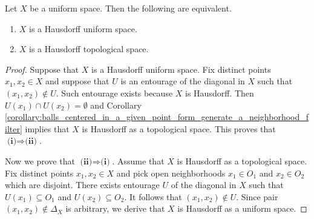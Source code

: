\documentclass[10pt]{amsart}
\begin{document}
\begin{fact}\label{fact:Hausdorff_uniform_space_is_Hausdorff_as_a_topological_space}
	Let $X$ be a uniform space. Then the following are equivalent.
	\begin{enumerate}[label=\emph{\textbf{(\arabic*)}}, leftmargin=3.0em]
		\item $X$ is a Hausdorff uniform space.
		\item $X$ is a Hausdorff topological space.
	\end{enumerate}
\end{fact}
\begin{proof}
	Suppose that $X$ is a Hausdorff uniform space. Fix distinct points $x_1,x_2 \in X$ and suppose that $U$ is an entourage of the diagonal in $X$ such that $(x_1,x_2) \not \in U$. Such entourage exists because $X$ is Hausdorff. Then $U(x_1)\cap U(x_2) = \emptyset$ and Corollary \ref{corollary:balls_centered_in_a_given_point_form_generate_a_neighborhood_filter} implies that $X$ is Hausdorff as a topological space. This proves that $\textbf{(i)}\Rightarrow \textbf{(ii)}$.

	Now we prove that $\textbf{(ii)}\Rightarrow \textbf{(i)}$. Assume that $X$ is Hausdorff as a topological space. Fix distinct points $x_1,x_2 \in X$ and pick open neighborhoods $x_1 \in O_1$ and $x_2 \in O_2$ which are disjoint. There exists entourage $U$ of the diagonal in $X$ such that $U(x_1) \subseteq O_1$ and $U(x_2) \subseteq O_2$. It follows that $(x_1,x_2) \not \in U$. Since pair $(x_1,x_2) \not \in \Delta_X$ is arbitrary, we derive that $X$ is Hausdorff as a uniform space.
\end{proof}
\end{document}
